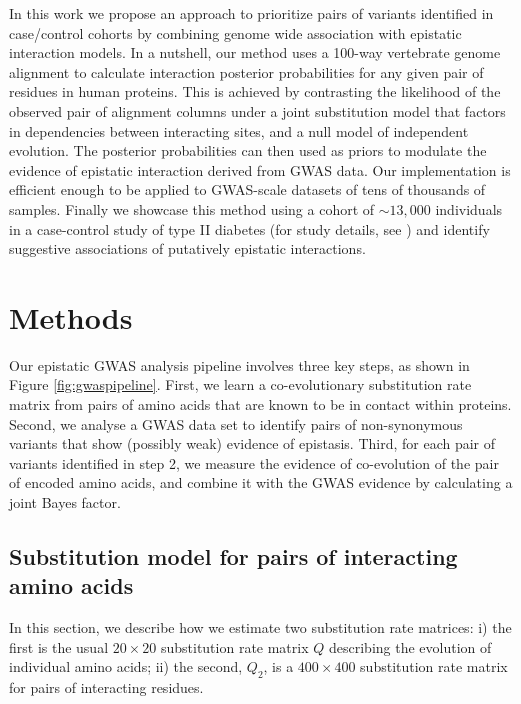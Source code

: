 In this work we propose an approach to prioritize pairs of variants identified in case/control cohorts by combining genome wide association with epistatic interaction models. 
In a nutshell, our method uses a 100-way vertebrate genome alignment \cite{blanchette2004aligning} to calculate interaction posterior probabilities for any given pair of residues in human proteins. 
This is achieved by contrasting the likelihood of the observed pair of alignment columns under a joint substitution model that factors in dependencies between interacting sites, and a null model of independent evolution. 
The posterior probabilities can then used as priors to modulate the evidence of epistatic interaction derived from GWAS data. 
Our implementation is efficient enough to be applied to GWAS-scale datasets of tens of thousands of samples. 
Finally we showcase this method using a cohort of $\sim 13,000$ individuals in a case-control study of type II diabetes (for study details, see \cite{mccarthy2015T2D}) and identify suggestive associations of putatively epistatic interactions.

\section{Methods \label{sec:gwasMeth}}

Our epistatic GWAS analysis pipeline involves three key steps, as shown in Figure \ref{fig:gwaspipeline}. 
First, we learn a co-evolutionary substitution rate matrix from pairs of amino acids that are known to be in contact within proteins. 
Second, we analyse a GWAS data set to identify pairs of non-synonymous variants that show (possibly weak) evidence of epistasis. 
Third, for each pair of variants identified in step 2, we measure the evidence of co-evolution of the pair of encoded amino acids, and combine it with the GWAS evidence by calculating a joint Bayes factor.


\subsection{Substitution model for pairs of interacting amino acids \label{sec:gwasQ2}}

In this section, we describe how we estimate two substitution rate matrices:
i) the first is the usual $20 \times 20$ substitution rate matrix $Q$ describing the evolution of individual amino acids;
ii) the second, $Q_2$, is a $400 \times 400$ substitution rate matrix for pairs of interacting residues. 

